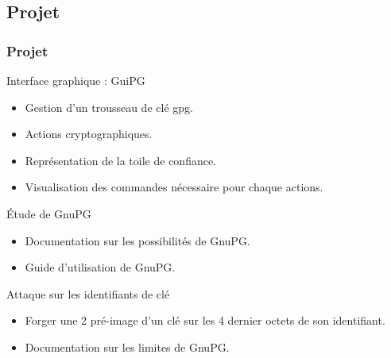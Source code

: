 \subsection{Projet}
\begin{frame}
    \frametitle{\color{white}Projet}
    \begin{block}{Interface graphique : GuiPG}
      \begin{itemize}
        \item Gestion d'un trousseau de clé gpg.
        \item Actions cryptographiques.
        \item Représentation de la toile de confiance.
        \item Visualisation des commandes nécessaire pour chaque actions.
      \end{itemize}

    \end{block}
    \begin{block}{Étude de GnuPG}
    \begin{itemize}
      \item Documentation sur les possibilités de GnuPG.
      \item Guide d'utilisation de GnuPG.
    \end{itemize}
      
    \end{block}
    \begin{block}{Attaque sur les identifiants de clé}
      \begin{itemize}
        \item Forger une 2 pré-image d'un clé sur les 4 dernier octets de son identifiant.
        \item Documentation sur les limites de GnuPG.
      \end{itemize}
    \end{block}
\end{frame}
